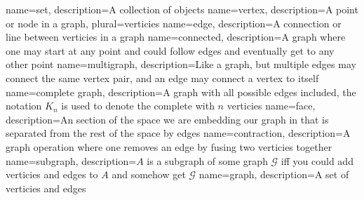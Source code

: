 \usepackage[toc,xindy]{glossaries}

\makenoidxglossaries

{
	name={set},
	description={A collection of objects}
}
{
	name={vertex},
	description={A point or node in a graph},
	plural={verticies}
}
{
	name={edge},
	description={A connection or line between verticies in a graph}
}
{
	name={connected},
	description={A graph where one may start at any point and could follow edges and eventually get to any other point}
}
{
	name={multigraph},
	description={Like a graph, but multiple edges may connect the same vertex pair, and an edge may connect a vertex to itself}
}
{
	name={complete graph},
	description={A graph with all possible edges included, the notation $K_n$ is used to denote the complete with $n$ verticies}
}
{
	name={face},
	description={An section of the space we are embedding our graph in that is separated from the rest of the space by edges}
}
{
	name={contraction},
	description={A graph operation where one removes an edge by fusing two verticies together}
}
{
	name={subgraph},
	description={$A$ is a subgraph of some graph $\mathcal G$ iff you could add verticies and edges to $A$ and somehow get $\mathcal G$}
}
{
	name={graph},
	description={A set of verticies and edges}
}
